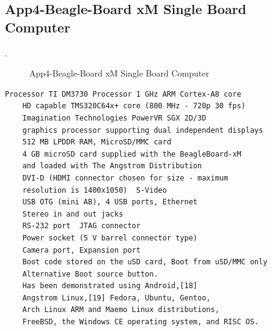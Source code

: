 \clearpage
\pagebreak

\subsection{App4-Beagle-Board xM Single Board Computer}.

\begin{figure}[htbp]
	\begin{center}
		\caption{App4-Beagle-Board xM Single Board Computer}
		\label{fig:App4-Beagle-Board-xM-SBC.jpg}
	\end{center}
\end{figure}

\lstset{basicstyle=\ttfamily\small}
\begin{lstlisting}[breaklines, frame=single, caption={App4-Specifications of Beagle Board xM SBC Board}, label=App4-Specifications-of-Beagle-Board-xM-SBC-Board]
    Processor TI DM3730 Processor 1 GHz ARM Cortex-A8 core
    HD capable TMS320C64x+ core (800 MHz - 720p 30 fps)
    Imagination Technologies PowerVR SGX 2D/3D 
    graphics processor supporting dual independent displays
    512 MB LPDDR RAM, MicroSD/MMC card
    4 GB microSD card supplied with the BeagleBoard-xM 
    and loaded with The Angstrom Distribution
    DVI-D (HDMI connector chosen for size - maximum 
    resolution is 1400x1050)  S-Video
    USB OTG (mini AB), 4 USB ports, Ethernet
    Stereo in and out jacks
    RS-232 port  JTAG connector
    Power socket (5 V barrel connector type)
    Camera port, Expansion port
    Boot code stored on the uSD card, Boot from uSD/MMC only
    Alternative Boot source button.
    Has been demonstrated using Android,[18] 
    Angstrom Linux,[19] Fedora, Ubuntu, Gentoo,
    Arch Linux ARM and Maemo Linux distributions,
    FreeBSD, the Windows CE operating system, and RISC OS.
\end{lstlisting}

